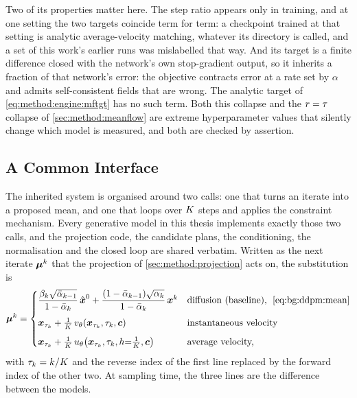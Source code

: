 Two of its properties matter here. The step ratio appears only in training, and at one
setting the two targets coincide term for term: a checkpoint trained at that setting is analytic
average-velocity matching,
whatever its directory is called, and a set of this work's earlier runs was mislabelled that way. And
its target is a finite difference closed with the network's own stop-gradient output, so it inherits
a fraction of that network's error: the objective contracts error at a rate set by $\alpha$ and
admits self-consistent fields that are wrong. The analytic target of \eqref{eq:method:engine:mftgt}
has no such term. Both this collapse and the $r=\tau$ collapse of \autoref{sec:method:meanflow} are
extreme hyperparameter values that silently change which model is measured, and both are checked by
assertion.

\subsection{A Common Interface}\label{sec:method:interface}

The inherited system is organised around two calls: one that turns an iterate into a proposed
mean, and one that loops over $K$ steps and applies the constraint mechanism. Every generative model
in this thesis implements exactly those two calls, and the projection code, the candidate plans,
the conditioning, the normalisation and the closed loop are shared verbatim. Written as the next iterate $\boldsymbol{\mu}^{k}$ that the projection of
\autoref{sec:method:projection} acts on, the substitution is
\begin{equation}\label{eq:method:engine:iface}
  \boldsymbol{\mu}^{k}
  = \begin{cases}
      \dfrac{\beta_{k}\sqrt{\bar{\alpha}_{k-1}}}{1-\bar{\alpha}_{k}}\,\hat{\boldsymbol{x}}^{0}
        + \dfrac{(1-\bar{\alpha}_{k-1})\sqrt{\alpha_{k}}}{1-\bar{\alpha}_{k}}\,\boldsymbol{x}^{k}
        & \text{diffusion (baseline),\; \eqref{eq:bg:ddpm:mean}}\\[10pt]
      \boldsymbol{x}_{\tau_{k}} + \tfrac{1}{K}\,
        v_{\theta}\!\left(\boldsymbol{x}_{\tau_{k}},\tau_{k},\boldsymbol{c}\right)
        & \text{instantaneous velocity}\\[6pt]
      \boldsymbol{x}_{\tau_{k}} + \tfrac{1}{K}\,
        u_{\theta}\!\left(\boldsymbol{x}_{\tau_{k}},\tau_{k},h{=}\tfrac{1}{K},\boldsymbol{c}\right)
        & \text{average velocity,}
    \end{cases}
\end{equation}
with $\tau_{k} = k/K$ and the reverse index of the first line replaced by the forward index
of the other two. At sampling time, the three lines are the difference between the models.

